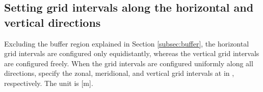 \subsection{Setting grid intervals along the horizontal and vertical directions} \label{subsec:gridinterv}

Excluding the buffer region explained in Section \ref{subsec:buffer}, the horizontal grid intervals are configured only equidistantly, whereas the
 vertical grid intervals are configured freely. When the grid intervals are  configured uniformly along all directions, specify the zonal, meridional, and vertical grid intervals  at  in , respectively. The unit is [m].

